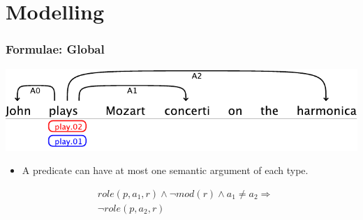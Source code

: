 \documentclass{beamer} \setbeamertemplate{navigation symbols}{}
\begin{document}
\section{Modelling}





\begin{frame}
  \frametitle{Formulae: Global}
  \begin{center}
    \includegraphics[scale=.70]{example-1}
  \end{center}

  \begin{itemize}
  \item A predicate can have at most one semantic argument of each
    type.
  \end{itemize}

 \begin{eqnarray*}
   &role\left(p,a_{1},r\right)\wedge \neg mod\left(r\right)\wedge a_{1}\neq a_{2}  \Rightarrow\\
   & \neg role\left(p,a_{2},r\right)
 \end{eqnarray*}


\end{frame}
\end{document}
